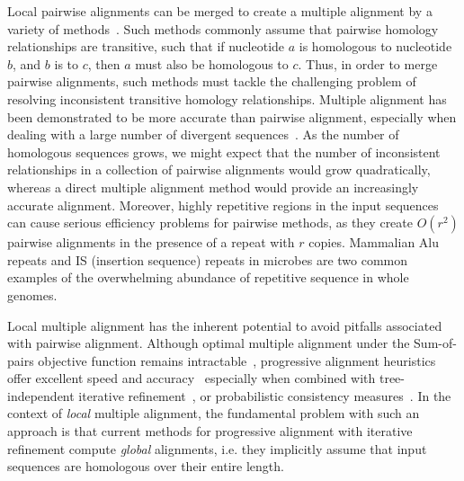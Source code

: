 \documentclass[12pt,journal,draftcls,letterpaper,onecolumn]{IEEEtran}
\begin{document}
Local pairwise alignments can be merged to create a multiple alignment by a variety of
methods~\cite{ref-tba,ref-dialign,ref-related1}. Such methods commonly assume that pairwise homology relationships are transitive, such that if nucleotide $a$ is homologous to nucleotide $b$, and $b$ is to $c$, then $a$ must also be homologous to $c$.  Thus, in order to merge pairwise alignments, such methods must tackle the challenging problem of resolving inconsistent transitive homology relationships.
Multiple alignment has been demonstrated to be more accurate than pairwise alignment, especially when dealing with a large number of divergent sequences~\cite{ref-mlagan,ref-aubergene}.  As the number of homologous sequences grows, we might expect that the number of inconsistent relationships in a collection of pairwise alignments would grow quadratically, whereas a direct multiple alignment method would provide an increasingly accurate alignment.  Moreover, highly repetitive regions in the input sequences can cause serious efficiency
problems for pairwise methods, as they create $O(r^{2})$ pairwise alignments in the presence of a repeat with $r$ copies.  Mammalian Alu repeats and IS (insertion sequence) repeats in microbes are two common examples of the overwhelming abundance of repetitive sequence in whole genomes.

Local multiple alignment has the inherent potential to avoid pitfalls associated with pairwise alignment. Although optimal multiple alignment under the Sum-of-pairs objective function remains intractable~\cite{ref-wangjiang}, progressive alignment heuristics offer excellent speed and accuracy~\cite{ref-clustalw,ref-tcoffee} especially when combined with tree-independent iterative
refinement~\cite{ref-muscle}, or probabilistic consistency measures~\cite{ref-probcons}. In the context of \textit{local}
multiple alignment, the fundamental problem with such an approach is
that current methods for progressive alignment with iterative
refinement compute \textit{global} alignments, i.e. they implicitly
assume that input sequences are homologous over their entire length.
\end{document}
